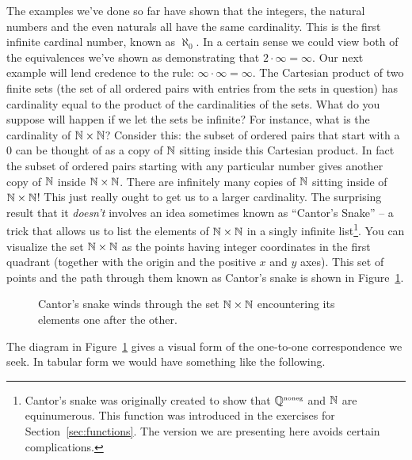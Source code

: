 The examples we've done so far have shown that the integers, 
the natural numbers and the even naturals all have the same 
cardinality. This is the first infinite cardinal number, known 
as $\aleph_0$.  In a certain sense we could view both
of the equivalences we've shown as demonstrating that 
$2 \cdot \infty = \infty$. Our next example will lend 
credence to the rule: $\infty \cdot \infty = \infty$.  
The Cartesian product of two finite sets (the set of all 
ordered pairs with entries from the sets in question) has 
cardinality equal to the product of the cardinalities of 
the sets.   What do you suppose will happen if we let the sets
be infinite?   For instance, what is the cardinality of 
${\mathbb N} \times {\mathbb N}$?   Consider this:
the subset of ordered pairs that start with a 0 can be thought of as a copy
of ${\mathbb N}$ sitting inside this Cartesian product.  In fact 
the subset of ordered pairs
starting with any particular number gives another copy of ${\mathbb N}$ 
inside ${\mathbb N} \times {\mathbb N}$.  There
are infinitely many copies of ${\mathbb N}$  sitting inside of 
${\mathbb N} \times {\mathbb N}$!  This just really ought
to get us to a larger cardinality.   The surprising result that it 
\emph{doesn't} involves an idea sometimes known as 
  ``Cantor's Snake'' -- a trick that allows 
us to list the elements of ${\mathbb N} \times {\mathbb N}$ in a singly 
infinite list\footnote{Cantor's snake was originally created to show 
that ${\mathbb Q}^{\mbox{\tiny noneg}}$ and ${\mathbb N}$ are equinumerous.
This function was introduced in the exercises for 
Section~\ref{sec:functions}.   The version we are presenting
here avoids certain complications.}.
You can visualize the set ${\mathbb N} \times {\mathbb N}$ as the 
points having integer coordinates
in the first quadrant (together with the origin and the positive 
$x$ and $y$ axes).
This set of points and the path through them known as Cantor's snake is
shown in Figure~\ref{fig:cantors_snake_2}.


\begin{figure}[!btp]

\caption[Cantor's snake.]{Cantor's snake winds through the set %
${\mathbb N} \times {\mathbb N}$ encountering its
elements one after the other.}
\label{fig:cantors_snake_2} 
\end{figure}

The diagram in Figure~\ref{fig:cantors_snake_2} gives a visual form of the one-to-one correspondence
we seek. In tabular form we would have something like the following.
\medskip

